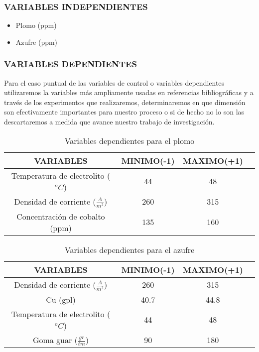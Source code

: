 \subsubsection{VARIABLES INDEPENDIENTES}
\begin{itemize}
 \item Plomo (ppm)
 \item Azufre (ppm)
\end{itemize}

\subsubsection{VARIABLES DEPENDIENTES}

Para el caso puntual de las variables de control o variables dependientes utilizaremos la variables m\'as ampliamente usadas en referencias bibliogr\'aficas y a trav\'es de los experimentos que realizaremos, determinaremos en que dimensi\'on son efectivamente importantes para nuestro proceso o si de hecho no lo son las descartaremos a medida que avance nuestro trabajo de investigaci\'on.

\begin{table}[H]
\label{tabla11}
\begin{center}
\begin{tabular}{|c|c|c|c|}
\hline
VARIABLES&MINIMO(-1)&MAXIMO(+1)\\
\hline
Temperatura de electrolito ($^oC$)&44&48\\
\hline
Densidad de corriente ($\frac{A}{m^2}$)&260&315\\
\hline
Concentraci\'on de cobalto (ppm)&135&160\\
\hline
\end{tabular}
\end{center}
\caption{Variables dependientes para el plomo}
\end{table}

\begin{table}[H]
\label{tabla12}
\begin{center}
\begin{tabular}{|c|c|c|c|}
\hline
VARIABLES&MINIMO(-1)&MAXIMO(+1)\\
\hline
Densidad de corriente ($\frac{A}{m^2}$)&260&315\\
\hline
Cu (gpl)&40.7&44.8\\
\hline
Temperatura de electrolito ($^oC$)&44&48\\
\hline
Goma guar ($\frac{gr}{tm}$)&90&180\\
\hline
\end{tabular}
\end{center}
\caption{Variables dependientes para el azufre}
\end{table}

